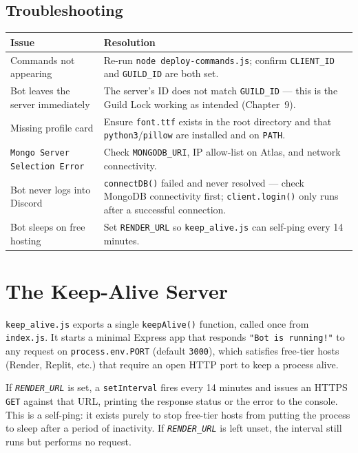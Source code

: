 \documentclass[12pt,a4paper]{report}
\newcommand{\param}[1]{\texttt{\color{cyberdark}\textit{#1}}}
\newcommand{\file}[1]{\texttt{\color{cyberpurple!80!black}#1}}
\begin{document}
\section{Troubleshooting}

\begin{center}
\begin{tabular}{p{5cm} p{10cm}}
\toprule
\textbf{Issue} & \textbf{Resolution} \\
\midrule
Commands not appearing     & Re-run \texttt{node deploy-commands.js}; confirm \texttt{CLIENT\_ID} and \texttt{GUILD\_ID} are both set. \\
Bot leaves the server immediately & The server's ID does not match \texttt{GUILD\_ID} --- this is the Guild Lock working as intended (Chapter~9). \\
Missing profile card       & Ensure \texttt{font.ttf} exists in the root directory and that \texttt{python3}/\texttt{pillow} are installed and on \texttt{PATH}. \\
\texttt{Mongo Server Selection Error} & Check \texttt{MONGODB\_URI}, IP allow-list on Atlas, and network connectivity. \\
Bot never logs into Discord & \texttt{connectDB()} failed and never resolved --- check MongoDB connectivity first; \texttt{client.login()} only runs after a successful connection. \\
Bot sleeps on free hosting & Set \texttt{RENDER\_URL} so \texttt{keep\_alive.js} can self-ping every 14 minutes. \\
\bottomrule
\end{tabular}
\end{center}

\chapter{The Keep-Alive Server}

\file{keep\_alive.js} exports a single \texttt{keepAlive()} function, called once from
\file{index.js}. It starts a minimal Express app that responds \texttt{"Bot is running!"} to any
request on \texttt{process.env.PORT} (default \texttt{3000}), which satisfies free-tier hosts
(Render, Replit, etc.) that require an open HTTP port to keep a process alive.

If \param{RENDER\_URL} is set, a \texttt{setInterval} fires every 14 minutes and issues an HTTPS
\texttt{GET} against that URL, printing the response status or the error to the console. This is a
self-ping: it exists purely to stop free-tier hosts from putting the process to sleep after a
period of inactivity. If \param{RENDER\_URL} is left unset, the interval still runs but performs no
request.
\end{document}
